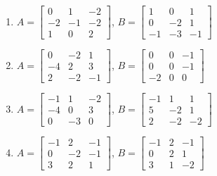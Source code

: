 \begin{exercise}
\begin{enumerate}
\item \(A=\begin{bmatrix} 0 & 1 & -2
\\ -2 & -1 & -2
\\ 1 & 0 & 2 \end{bmatrix}\),
\(B=\begin{bmatrix} 1 & 0 & 1
\\ 0 & -2 & 1
\\ -1 & -3 & -1 \end{bmatrix}\)

\item \(A=\begin{bmatrix} 0 & -2 & 1
\\ -4 & 2 & 3
\\ 2 & -2 & -1 \end{bmatrix}\),
\(B=\begin{bmatrix} 0 & 0 & -1
\\ 0 & 0 & -1
\\ -2 & 0 & 0 \end{bmatrix}\)

\item \(A=\begin{bmatrix} -1 & 1 & -2
\\ -4 & 0 & 3
\\ 0 & -3 & 0 \end{bmatrix}\),
\(B=\begin{bmatrix} -1 & 1 & 1
\\ 5 & -2 & 1
\\ 2 & -2 & -2 \end{bmatrix}\)

\item \(A=\begin{bmatrix} -1 & 2 & -1
\\ 0 & -2 & -1
\\ 3 & 2 & 1 \end{bmatrix}\),
\(B=\begin{bmatrix} -1 & 2 & -1
\\ 0 & 2 & 1
\\ 3 & 1 & -2 \end{bmatrix}\)

\end{enumerate}
\end{exercise}


